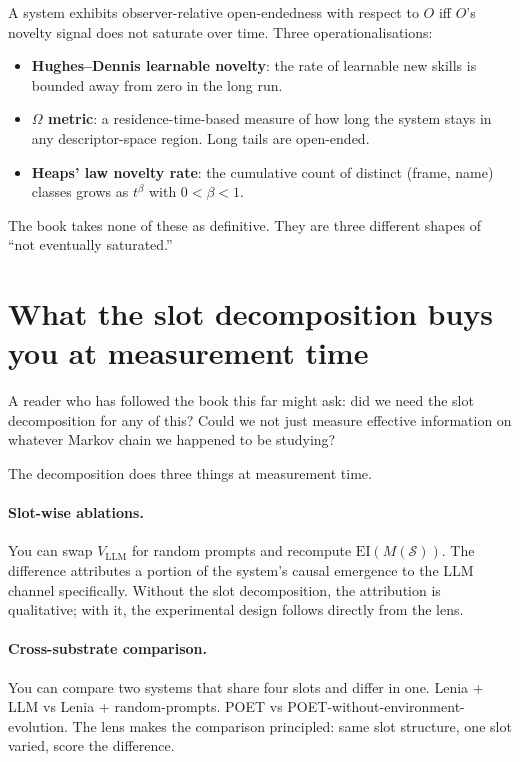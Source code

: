 A system exhibits observer-relative open-endedness with respect to
$O$ iff $O$'s novelty signal does not saturate over time. Three
operationalisations:

\begin{itemize}[leftmargin=1.5em,itemsep=2pt]
  \item \textbf{Hughes--Dennis learnable novelty}: the rate of
    learnable new skills is bounded away from zero in the long run.
  \item \textbf{$\Omega$ metric}: a residence-time-based measure of
    how long the system stays in any descriptor-space region. Long
    tails are open-ended.
  \item \textbf{Heaps' law novelty rate}: the cumulative count of
    distinct (frame, name) classes grows as $t^\beta$ with $0 < \beta
    < 1$.
\end{itemize}

The book takes none of these as definitive. They are three different
shapes of ``not eventually saturated.''

\section{What the slot decomposition buys you at measurement time}

A reader who has followed the book this far might ask: did we need
the slot decomposition for any of this? Could we not just measure
effective information on whatever Markov chain we happened to be
studying?

The decomposition does three things at measurement time.

\paragraph{Slot-wise ablations.} You can swap $V_{\mathrm{LLM}}$ for
random prompts and recompute $\mathrm{EI}(M(\mathcal{S}))$. The
difference attributes a portion of the system's causal emergence to
the LLM channel specifically. Without the slot decomposition, the
attribution is qualitative; with it, the experimental design follows
directly from the lens.

\paragraph{Cross-substrate comparison.} You can compare two systems
that share four slots and differ in one. Lenia + LLM vs Lenia +
random-prompts. POET vs POET-without-environment-evolution. The lens
makes the comparison principled: same slot structure, one slot
varied, score the difference.

